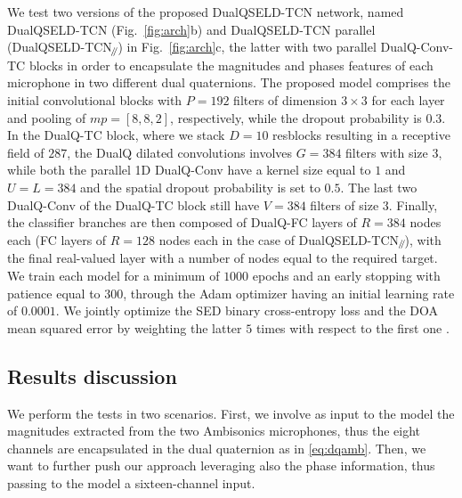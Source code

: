 \documentclass[3p, preprint, twocolumn]{elsarticle}
\newcommand{\parallelsum}{\mathbin{\!/\mkern-5mu/\!}}
\begin{document}
We test two versions of the proposed DualQSELD-TCN network, named DualQSELD-TCN (Fig.~\ref{fig:arch}b) and DualQSELD-TCN parallel (DualQSELD-TCN$_{\parallelsum}$) in Fig.~\ref{fig:arch}c, the latter with two parallel DualQ-Conv-TC blocks in order to encapsulate the magnitudes and phases features of each microphone in two different dual quaternions.
The proposed model comprises the initial convolutional blocks with $P = 192$ filters of dimension $3 \times 3$ for each layer and pooling of $mp = [8, 8, 2]$, respectively, while the dropout probability is $0.3$. In the DualQ-TC block, where we stack $D = 10$ resblocks resulting in a receptive field of $287$, the DualQ dilated convolutions involves $G = 384$ filters with size $3$, while both the parallel 1D DualQ-Conv have a kernel size equal to $1$ and $U = L = 384$ and the spatial dropout probability is set to $0.5$. The last two DualQ-Conv of the DualQ-TC block still have $V = 384$ filters of size $3$. Finally, the classifier branches are then composed of DualQ-FC layers of $R = 384$ nodes each (FC layers of $R = 128$ nodes each in the case of DualQSELD-TCN$_{\parallelsum}$), with the final real-valued layer with a number of nodes equal to the required target. We train each model for a minimum of $1000$ epochs and an early stopping with patience equal to $300$, through the Adam optimizer having an initial learning rate of $0.0001$. We jointly optimize the SED binary cross-entropy loss and the DOA mean squared error by weighting the latter $5$ times with respect to the first one \cite{guizzo2021l3das21}.

\subsection{Results discussion}
We perform the tests in two scenarios. First, we involve as input to the model the magnitudes extracted from the two Ambisonics microphones, thus the eight channels are encapsulated in the dual quaternion as in \eqref{eq:dqamb}. Then, we want to further push our approach leveraging also the phase information, thus passing to the model a sixteen-channel input.
\end{document}
